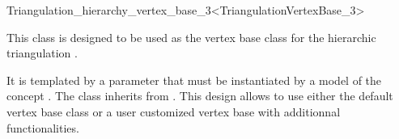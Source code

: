 

\begin{ccRefClass}{Triangulation_hierarchy_vertex_base_3<TriangulationVertexBase_3>}


\ccDefinition
  
This class is designed to be used as the vertex base class for the
hierarchic triangulation .

It is templated
by a parameter that must be instantiated by a model of  the concept
. The class
inherits from .  
This design allows to use either the default vertex base class or a
user customized vertex base with additionnal functionalities.



\ccInheritsFrom
{}

\ccTypes
{}

\ccSeeAlso
{}\\
\\
\\

\end{ccRefClass}

